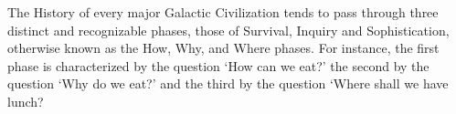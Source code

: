 \label{chapter:introduction}

The History of every major Galactic Civilization tends to pass through three distinct and recognizable phases, those of Survival, Inquiry and Sophistication, otherwise known as the How, Why, and Where phases. For instance, the first phase is characterized by the question `How can we eat?' the second by the question `Why do we eat?' and the third by the question `Where shall we have lunch?